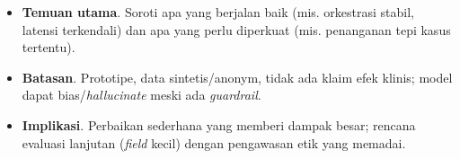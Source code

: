 \begin{itemize}
  \item \textbf{Temuan utama}. Soroti apa yang berjalan baik (mis. orkestrasi stabil, latensi terkendali) dan apa yang perlu diperkuat (mis. penanganan tepi kasus tertentu).
  \item \textbf{Batasan}. Prototipe, data sintetis/anonym, tidak ada klaim efek klinis; model dapat bias/\textit{hallucinate} meski ada \textit{guardrail}.
  \item \textbf{Implikasi}. Perbaikan sederhana yang memberi dampak besar; rencana evaluasi lanjutan (\textit{field} kecil) dengan pengawasan etik yang memadai.
\end{itemize}

